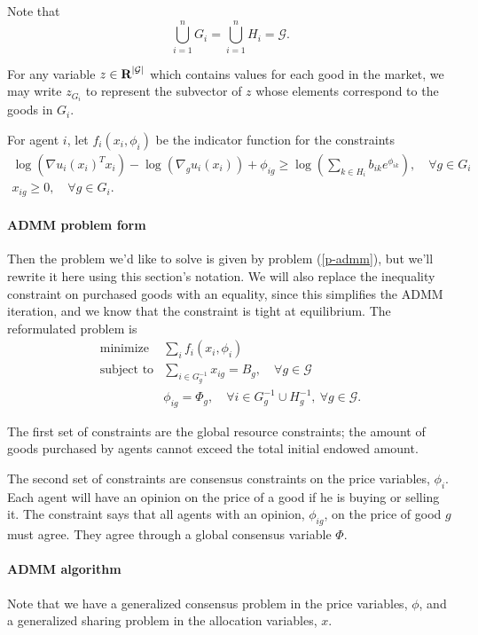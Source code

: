 \documentclass[12pt]{article}
\begin{document}
Note that
\[
\bigcup_{i=1}^n G_i = \bigcup_{i=1}^n H_i = \mathcal{G}.
\]

For any variable $z \in {\mbox{\bf R}}^{|\mathcal{G}|}$ which contains values for
each good in the market, we may write $z_{G_i}$ to represent the subvector
of $z$ whose elements correspond to the goods in $G_i$.

For agent $i$, let $f_i(x_i, \phi_i)$ be the indicator function for the
constraints
\[
\begin{array}{c}
\log(\nabla u_i(x_i)^T x_i) - \log(\nabla_g u_i(x_i)) + \phi_{ig} \geq  \log\left(\sum\limits_{k \in H_i} b_{ik} e^{\phi_{ik}}\right),\quad \forall g \in G_i\\
x_{ig} \geq 0, \quad \forall g \in G_i.
\end{array}
\]

\paragraph{ADMM problem form} Then the problem we'd like to solve is given by
problem (\ref{p-admm}), but we'll rewrite it here using this section's notation.
We will also replace the inequality constraint on purchased goods with an
equality, since this simplifies the ADMM iteration, and we know that
the constraint is tight at equilibrium.
The reformulated problem is
\[
\begin{array}{ll}
\mbox{minimize} & \sum_i f_i(x_i, \phi_i) \\
\mbox{subject to} & \sum\limits_{i \in G^{-1}_g} x_{ig} = B_g,\quad \forall g \in \mathcal{G}\\
& \phi_{ig} = \Phi_g,\quad \forall i \in G^{-1}_g \cup H^{-1}_g,\ \forall g \in \mathcal{G}.
\end{array}
\]

The first set of constraints are the global resource constraints; the amount of
goods purchased by agents cannot exceed the total initial endowed amount.

The second set of constraints are consensus constraints on the price variables,
$\phi_i$.
Each agent will have an opinion on the price of a good if he is buying or selling it.
The constraint says that all agents with an opinion, $\phi_{ig}$, on the price
of good $g$ must agree.
They agree through a global consensus variable $\Phi$.


\paragraph{ADMM algorithm}
Note that we have a generalized consensus problem in the price variables,
$\phi$, and a generalized sharing problem in the allocation variables, $x$.
\end{document}
